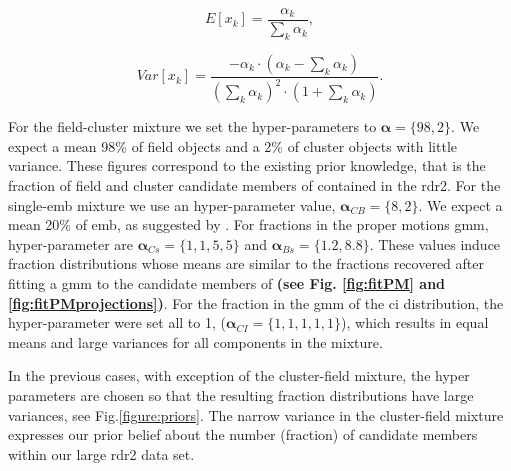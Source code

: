 \begin{equation}
E[x_k]=\frac{\alpha_k}{\sum_k \alpha_k},
\end{equation}

\begin{equation}
Var[x_k]=\frac{-\alpha_k\cdot (\alpha_k -\sum_k \alpha_k)}{(\sum_k \alpha_k)^2 \cdot (1+\sum_k \alpha_k)}.
\end{equation}

For the field-cluster mixture we set the hyper-parameters to $\boldsymbol{\alpha}=\{98,2\}$. We expect a mean 98\% of field objects and a 2\% of cluster objects with little variance. These figures correspond to the existing prior knowledge, that is the fraction of field and cluster candidate members of \citet{Bouy2015} contained in the \gls{rdr2}. 
For the single-\gls{emb} mixture we use an hyper-parameter value, $\boldsymbol{\alpha}_{CB}=\{8,2\}$. We expect a mean 20\% of \gls{emb}, as suggested by \citet{Bouy2015}. 
For fractions in the proper motions \gls{gmm}, hyper-parameter are $\boldsymbol{\alpha}_{Cs}=\{1,1,5,5\}$ and $\boldsymbol{\alpha}_{Bs}=\{1.2,8.8\}$. These values induce fraction distributions whose means are similar to the fractions recovered after fitting a \gls{gmm} to the  candidate members of \citet{Bouy2015} \textbf{(see Fig. \ref{fig:fitPM} and \ref{fig:fitPMprojections})}. 
For the fraction in the \gls{gmm} of the \gls{ci} distribution, the hyper-parameter were set all to 1, ($\boldsymbol{\alpha}_{CI}=\{1,1,1,1,1\}$), which results in equal means and large variances for all {components in the mixture}. 

{In the previous cases, with exception of the cluster-field mixture, the hyper parameters are chosen so that the resulting fraction distributions have large variances, see Fig.\ref{figure:priors}.} The narrow variance in the cluster-field mixture expresses our prior belief about the number (fraction) of candidate members within our large \gls{rdr2} data set.

